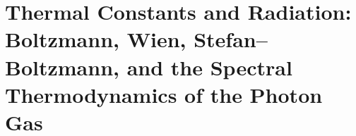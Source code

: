 \chapter{Thermal Constants and Radiation: Boltzmann, Wien, Stefan--Boltzmann, and the Spectral Thermodynamics of the Photon Gas}
\label{chap:p3-final:48:constantes_termicas}

